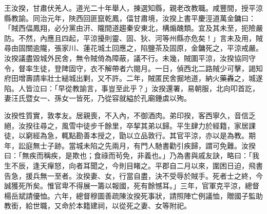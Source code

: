 \begin{pinyinscope}
王汝揆，甘肅伏羌人。道光二十年舉人，揀選知縣，親老改教職。咸豐間，授平涼縣教諭。同治元年，陜西回匪竄乾鳳，偪甘肅境，汝揆上書平慶涇道萬金鏞曰：「賊西偪鳳翔，必分黨由汧、隴間道趨秦安東北，構煽醜類。宜及其未至，扼險嚴防。不然，內應且四起，平涼擾則靈、固、狄、河等州縣亦危矣！」言未及用，賊尋由固關逾隴，張家川、蓮花城土回應之，陷鹽茶及固原，金鏞死之，平涼戒嚴。汝揆議盡毀城外民舍，無令賊倚為障蔽，議不行。未幾，賊圍平涼，汝揆協同守令，督率生徒，登陴固守，衣不解帶者六閱月。一日，偵西北二路賊少可擊，謁知府田增壽請率壯士縋城出剿，又不許。二年，賊匿民舍掘地道，納火藥轟之，城遂陷。人皆泣曰：「早從教諭言，事豈至此乎？」汝揆還署，易朝服，北向叩首訖，妻汪氏暨女一、孫女一皆死，乃從容就縊於孔廟鍾虡以殉。

汝揆性質實，敦孝友。居親喪，不入內，不御酒肉。弟印揆，客西寧久，音信乏絕，汝揆往尋之，風雪中徒步千餘里，卒挈其弟以歸。平生肆力於經籍，家居課徒，以窮經為急，輒點勘善本授之，勖以立品敦行。其官平涼，亦以是為教。期年，訟庭無士子跡。當城未陷之先兩月，有門人馳書勸引疾歸，謂可免難。汝揆曰：「無疾而稱疾，是欺也；食祿而茍免，非義也。」乃為書與戚友訣，略曰：「我生不辰，逢天癉怒，向者耳聞之，今則目睹之。平郡自二月以來，圍困日迫，飛書告急，援兵無一至者。汝揆妻、女，行當自盡，決不受辱於賊手。死者士之終，今誠獲死所矣。惟官卑不得展一籌以報國，死有餘憾耳。」三年，官軍克平涼，總督楊岳斌請優恤。六年，總督穆圖善疏陳汝揆死事狀，請照陣亡例議恤，贈國子監助教銜，給世職，又命於本籍建祠，以從死之妻、女等附祀。


\end{pinyinscope}